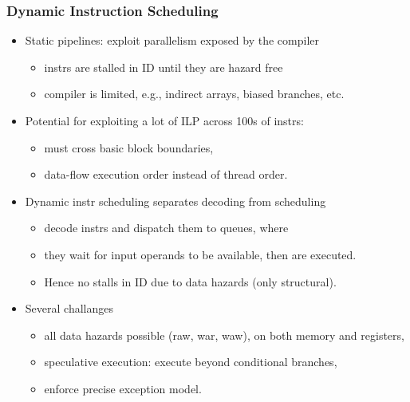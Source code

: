 \documentclass{beamer}
\begin{document}
\begin{frame}[fragile,t]
\frametitle{Dynamic Instruction Scheduling}

\begin{itemize}
    \item Static pipelines: exploit parallelism exposed by the compiler\pause
            \begin{itemize}
                \item instrs are stalled in ID until they are hazard free
                \item compiler is limited, e.g., 
                        indirect arrays, biased branches, etc.
            \end  {itemize}\medskip
 
    \item Potential for exploiting a lot of ILP across 100s of instrs:\pause
            \begin{itemize}
                \item must cross basic block boundaries,
                \item data-flow execution order instead of thread order.
            \end  {itemize}\medskip

    \item Dynamic instr scheduling separates decoding from scheduling\pause
            \begin{itemize}
                \item decode instrs and dispatch them to queues, where
                \item they wait for input operands to be available,
                        then are executed.
                \item Hence no stalls in ID due to data hazards (only structural).
            \end  {itemize}\medskip

    \item Several challanges\pause
            \begin{itemize}
                \item all data hazards possible ({\sc raw}, {\sc war}, {\sc waw}),
                        on both memory and registers,
                \item speculative execution: execute beyond conditional branches,
                \item enforce precise exception model.
            \end  {itemize}\medskip
\end  {itemize}

\end{frame}
\end{document}
